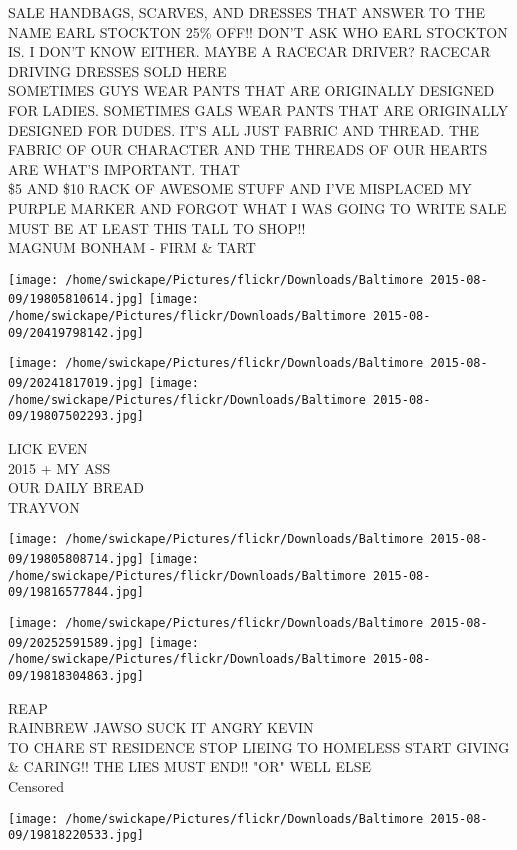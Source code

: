 \documentclass[10pt,letterpaper]{article}
\begin{document}
SALE HANDBAGS, SCARVES, AND DRESSES THAT ANSWER TO THE NAME EARL STOCKTON 25\% OFF!!  DON'T ASK WHO EARL STOCKTON IS.  I DON'T KNOW EITHER.  MAYBE A RACECAR DRIVER?  RACECAR DRIVING DRESSES SOLD HERE\\
SOMETIMES GUYS WEAR PANTS THAT ARE ORIGINALLY DESIGNED FOR LADIES.  SOMETIMES GALS WEAR PANTS THAT ARE ORIGINALLY DESIGNED FOR DUDES.  IT'S ALL JUST FABRIC AND THREAD.  THE FABRIC OF OUR CHARACTER AND THE THREADS OF OUR HEARTS ARE WHAT'S IMPORTANT.  THAT\\
\$5 AND \$10 RACK OF AWESOME STUFF AND I'VE MISPLACED MY PURPLE MARKER AND FORGOT WHAT I WAS GOING TO WRITE SALE MUST BE AT LEAST THIS TALL TO SHOP!!\\
MAGNUM BONHAM {-} FIRM \& TART\\
\pagebreak

\texttt{[image: /home/swickape/Pictures/flickr/Downloads/Baltimore 2015-08-09/19805810614.jpg]}
\texttt{[image: /home/swickape/Pictures/flickr/Downloads/Baltimore 2015-08-09/20419798142.jpg]}

\texttt{[image: /home/swickape/Pictures/flickr/Downloads/Baltimore 2015-08-09/20241817019.jpg]}
\texttt{[image: /home/swickape/Pictures/flickr/Downloads/Baltimore 2015-08-09/19807502293.jpg]}

LICK EVEN\\
2015 + MY ASS\\
OUR DAILY BREAD\\
TRAYVON\\
\pagebreak

\texttt{[image: /home/swickape/Pictures/flickr/Downloads/Baltimore 2015-08-09/19805808714.jpg]}
\texttt{[image: /home/swickape/Pictures/flickr/Downloads/Baltimore 2015-08-09/19816577844.jpg]}

\texttt{[image: /home/swickape/Pictures/flickr/Downloads/Baltimore 2015-08-09/20252591589.jpg]}
\texttt{[image: /home/swickape/Pictures/flickr/Downloads/Baltimore 2015-08-09/19818304863.jpg]}

REAP\\
RAINBREW JAWSO SUCK IT ANGRY KEVIN\\
TO CHARE ST RESIDENCE STOP LIEING TO HOMELESS START GIVING \& CARING!! THE LIES MUST END!! "OR" WELL ELSE\\
Censored\\
\pagebreak

\texttt{[image: /home/swickape/Pictures/flickr/Downloads/Baltimore 2015-08-09/19818220533.jpg]}
\end{document}
